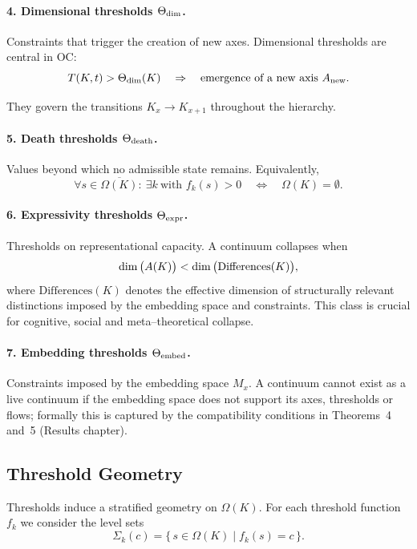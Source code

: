 \paragraph{4. Dimensional thresholds \(\Theta_{\rm dim}\).}
Constraints that trigger the creation of new axes.
Dimensional thresholds are central in OC:
\[
   T(K,t) > \Theta_{\rm dim}(K)
   \quad\Rightarrow\quad
   \text{emergence of a new axis } A_{\rm new}.
\]

They govern the transitions \(K_x \to K_{x+1}\) throughout the hierarchy.

\paragraph{5. Death thresholds \(\Theta_{\rm death}\).}
Values beyond which no admissible state remains. Equivalently,
\[
   \forall s\in\overline{\Omega(K)}:\ \exists k\ \text{with } f_k(s) > 0
   \quad\Longleftrightarrow\quad
   \Omega(K)=\emptyset.
\]

\paragraph{6. Expressivity thresholds \(\Theta_{\rm expr}\).}
Thresholds on representational capacity. A continuum collapses when
\[
   \dim\big(A(K)\big)
   <
   \dim\big({\rm Differences}(K)\big),
\]
where \(\mathrm{Differences}(K)\) denotes the effective dimension of
structurally relevant distinctions imposed by the embedding space and
constraints. This class is crucial for cognitive, social and meta–theoretical
collapse.

\paragraph{7. Embedding thresholds \(\Theta_{\rm embed}\).}
Constraints imposed by the embedding space \(M_x\).
A continuum cannot exist as a live continuum if the embedding space does not
support its axes, thresholds or flows; formally this is captured by the
compatibility conditions in Theorems~4 and~5 (Results chapter).

\subsection{Threshold Geometry}

Thresholds induce a stratified geometry on \(\Omega(K)\).
For each threshold function \(f_k\) we consider the level sets
\[
  \Sigma_k(c) = \{\, s \in \Omega(K) \mid f_k(s) = c \,\}.
\]

